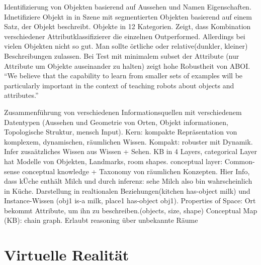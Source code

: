 \par

\cite{atrBasedObjIden} \newline
Identifizierung von Objekten basierend auf Aussehen und Namen Eigenschaften. \newline
Idnetifiziere Objekt in in Szene mit segmentierten Objekten basierend auf einem Satz, der Objekt beschreibt.  Objekte in 12 Kategorien. \newline
Zeigt, dass Kombination verschiedener Attributklassifizierer die einzelnen Outperformed. Allerdings bei vielen Objekten nicht so gut. Man sollte örtliche oder relative(dunkler, kleiner) Beschreibungen zulassen. Bei Test mit minimalem subset der Attribute (nur Attribute um Objekte auseinander zu halten) zeigt hohe Robustheit von ABOI.
``We believe that the capability to learn from smaller sets
of examples will be particularly important in the context of
teaching robots about objects and attributes.'' \par


\cite{pronobis1} \newline
Zusammenführung von verschiedenen Informationsquellen mit verschiedenem Datentypen (Aussehen und Geometrie von Orten, Objekt informationen, Topologische Struktur, mensch Input). Kern: kompakte Repräsentation von komplexem, dynamischen, räumlichen Wissen. \newline
Kompakt: robuster mit Dynamik. \newline
Infer zusaätzliches Wissen aus Wissen + Sehen. \newline
KB in 4 Layers, categorical Layer hat Modelle von Objekten, Landmarks, room shapes. \newline
conceptual layer: Common-sense conceptual knowledge + Taxonomy von räumlichen Konzepten. Hier Info, dass kÜche enthält Milch und durch inferenz: sehe Milch also bin wahrscheinlich in Küche. Darstellung in realtionalen Beziehungen(kitchen has-object milk) und Instance-Wissen (obj1 is-a milk, place1 has-object obj1).\newline
Properties of Space: Ort bekommt Attribute, um ihn zu beschreiben.(objects, size, shape) \newline
Conceptual Map (KB): chain graph. Erlaubt reasoning über unbekannte Räume







\section{Virtuelle Realität}

